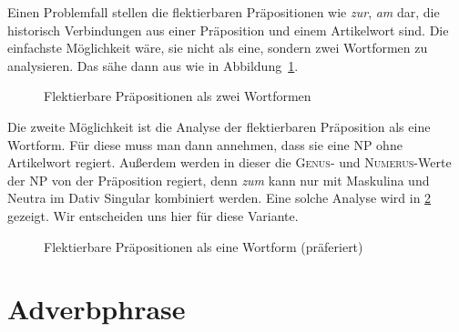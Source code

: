 Einen Problemfall stellen die flektierbaren Präpositionen wie \textit{zur}, \textit{am} dar, die historisch Verbindungen aus einer Präposition und einem Artikelwort sind.
Die einfachste Möglichkeit wäre, sie nicht als eine, sondern zwei Wortformen zu analysieren.
Das sähe dann aus wie in Abbildung~\ref{fig:flektprpreanalyse}.

\begin{figure}
  \centering
  \caption{Flektierbare Präpositionen als zwei Wortformen}
  \label{fig:flektprpreanalyse}
\end{figure}

Die zweite Möglichkeit ist die Analyse der flektierbaren Präposition als eine Wortform.
Für diese muss man dann annehmen, dass sie eine NP ohne Artikelwort regiert.
Außerdem werden in dieser die \textsc{Genus}- und \textsc{Numerus}-Werte der NP von der Präposition regiert, denn \textit{zum} kann \zB nur mit Maskulina und Neutra im Dativ Singular kombiniert werden.
Eine solche Analyse wird in \ref{fig:flektprpalswortform} gezeigt.
Wir entscheiden uns hier für diese Variante.

\begin{figure}
  \centering
  \caption{Flektierbare Präpositionen als eine Wortform (präferiert)}
  \label{fig:flektprpalswortform}
\end{figure}

\section{Adverbphrase}

\label{sec:advgr}



